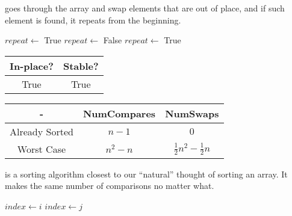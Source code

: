 \documentclass{report}
\begin{document}
 goes through the array and swap elements that are out of place, and if such element is found, it repeats from the beginning.

\noindent \hrulefill
\begin{algorithmic}[1]
   
    \State $repeat \gets$ True
      \State $repeat \gets$ False
          \State {} 
          \State $repeat \gets$ True
        \EndIf
      \EndFor
    \EndWhile
    \State {}
  \EndFunction
\end{algorithmic}
\noindent \hrulefill

\begin{center}
  \begin{tabular}{ | c | c | }
    \hline
    In-place? & Stable? \\
    \hline
    True & True \\
    \hline
  \end{tabular}
\end{center}

\begin{center}
  \begin{tabular}{ | c | c | c | }
    \hline
    - & NumCompares & NumSwaps \\
    \hline
    Already Sorted & $n - 1$ & $0$ \\
    \hline
    Worst Case & $n^{2} - n$ & $\frac{1}{2} n^{2} - \frac{1}{2} n$ \\
    \hline
  \end{tabular}
\end{center}

 is a sorting algorithm closest to our ``natural'' thought of sorting an array. It makes the same number of comparisons no matter what.

\noindent \hrulefill
\begin{algorithmic}[1]
   
    \State $index \gets i$
          \State $index \gets j$
        \EndIf
      \EndFor
        \State {} 
      \EndIf
    \EndFor
    \State {}
  \EndFunction
\end{algorithmic}
\noindent \hrulefill
\end{document}
